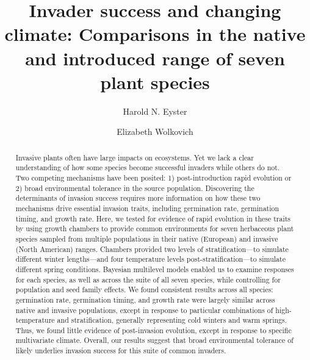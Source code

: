 \documentclass[12pt]{article}\usepackage[]{graphicx}\usepackage[]{color}
\title{Invader success and changing climate: Comparisons in the native and introduced range of seven plant species}
\author[1]{Harold N. Eyster}
\author[2]{Elizabeth Wolkovich}
\affil[1]{Institute for Resources, Environment, and Sustainability, University of British Columbia}
\affil[2]{Department of Forest and Conservation Science, University of British Columbia}
\date{}                     %
\begin{document}
\maketitle

\begin{spacing}{1} %
	\begin{abstract} 
Invasive plants often have large impacts on ecosystems. Yet we lack a clear understanding of how some species become successful invaders while others do not. Two competing mechanisms have been posited: 1) post-introduction rapid evolution or 2) broad environmental tolerance in the source population. 
Discovering the determinants of invasion success requires more information on how these two mechanisms drive essential invasion traits, including germination rate, germination timing, and growth rate. 
Here, we tested for evidence of rapid evolution in these traits by using growth chambers to provide common environments for seven herbaceous plant species sampled from multiple populations in their native (European) and invasive (North American) ranges. Chambers provided two levels of stratification---to simulate different winter lengths---and four temperature levels post-stratification---to simulate different spring conditions. Bayesian multilevel models enabled us to examine responses for each species, as well as across the suite of all seven species, while controlling for population and seed family effects. We found consistent results across all species: germination rate, germination timing, and growth rate were largely similar across native and invasive populations, except in response to particular combinations of high-temperature and stratification, generally representing cold winters and warm springs. Thus, we found little evidence of post-invasion evolution, except in response to specific multivariate climate. Overall, our results suggest that broad environmental tolerance of likely underlies invasion success for this suite of common invaders.
	\end{abstract}
\end{spacing}		
\end{document}
